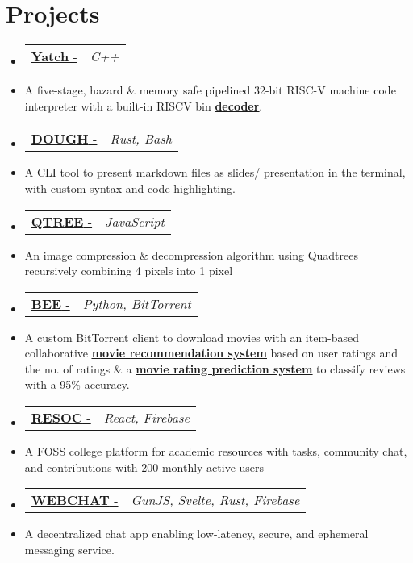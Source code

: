 \documentclass[letterpaper,10pt]{article}
\makeatletter
\newcommand{\resumeItem}[1]{
  \item\small{
    {#1 \vspace{-2pt}}
  }
}
\newcommand{\resumeProjectHeading}[2]{
    \item
    \begin{tabular*}{0.97\textwidth}{l@{\extracolsep{\fill}}r}
      \small#1 & \textit{\small #2} \\
    \end{tabular*}\vspace{-4 pt}
}
\newcommand{\resumeSubItem}[1]{\resumeItem{#1}\vspace{-4pt}}
\newcommand{\resumeSubHeadingListStart}{\begin{itemize}[leftmargin=0.15in, label={}]}
\newcommand{\resumeSubHeadingListEnd}{\end{itemize}}
\makeatother
\begin{document}


\section{Projects}
  \resumeSubHeadingListStart
\resumeProjectHeading
  {\href{https://github.com/fuzzymf/yatch}{\textbf{Yatch} - \faIcon{link}}}{C++}
    \resumeSubItem
      {A five-stage, hazard \& memory safe pipelined 32-bit RISC-V machine code interpreter with a built-in RISCV bin {\href{https://anubhavp.dev/barney}{\underline{\textbf{decoder}}}}.}
  \resumeProjectHeading
    {\href{https://github.com/fuzzymf/dough}{\textbf{DOUGH} - \faIcon{link}}}{Rust, Bash}
    \resumeSubItem
      {A CLI tool to present markdown files as slides/ presentation in the terminal, with custom syntax and code highlighting.}
  \resumeProjectHeading
    {\href{https://anubhavp.dev/blog/qtree.html}{\textbf{QTREE} - \faIcon{link}}}{JavaScript}
    \resumeSubItem
      {An image compression \& decompression algorithm using Quadtrees recursively combining 4 pixels into 1 pixel}
  \resumeProjectHeading
    {\href{https://github.com/fuzzymf/b}{{\textbf{BEE} - \faIcon{link} }}}{Python, BitTorrent}
    \resumeSubItem
      {A custom BitTorrent client to download movies with an item-based collaborative \href{https://github.com/fuzzymf/Movie-recommendation}{\underline{\textbf{ movie recommendation system}}} based on user ratings and the no. of ratings \& a \href{https://github.com/fuzzymf/Movie-rating-prediction}{\underline{\textbf{movie rating prediction system}}} to classify reviews with a 95\% accuracy.}
  \resumeProjectHeading
    {\href{https://github.com/fuzzymf/resoc}{\textbf{RESOC} - \faIcon{link} }}{React, Firebase}
    \resumeSubItem
      {A FOSS college platform for academic resources with tasks, community chat, and contributions with 200 monthly active users}
    \resumeProjectHeading
    {\href{https://github.com/fuzzymf/w3bchat-dapp}{\textbf{WEBCHAT} - \faIcon{link}}}{GunJS, Svelte, Rust, Firebase}
    \resumeSubItem
      {A decentralized chat app enabling low-latency, secure, and ephemeral messaging service.}
  \resumeSubHeadingListEnd

%
\end{document}
